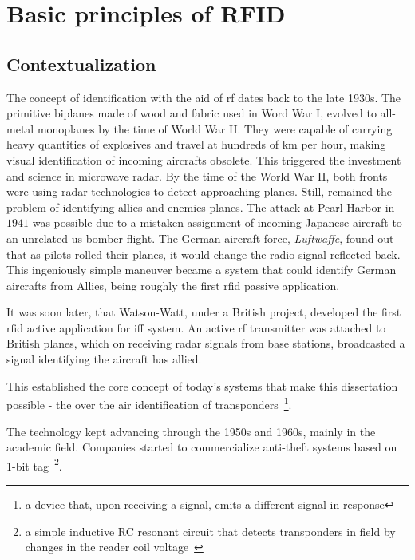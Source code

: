\chapter{Basic principles of RFID}

\section{Contextualization} \label{sec:contextualization}

The concept of identification with the aid of \ac{rf} dates back to the late 1930s. 
The primitive biplanes made of wood and fabric used in Word War I, evolved to all-metal monoplanes by the time of World War II. They were capable of carrying heavy quantities of explosives and travel at hundreds of km per hour, making visual identification of incoming aircrafts obsolete.
This triggered the investment and science in microwave radar.
By the time of the World War II, both fronts were using radar technologies to detect approaching planes. 
Still, remained the problem of identifying allies and enemies planes.
The attack at Pearl Harbor in $1941$ was possible due to a mistaken assignment of incoming Japanese aircraft to an unrelated \ac{us} bomber flight.
The German aircraft force, \emph{Luftwaffe}, found out that as pilots rolled their planes, it would change the radio signal reflected back. This ingeniously simple maneuver became a system that could identify German aircrafts from Allies, being roughly the first \ac{rfid} passive application.~\cite{dobkinRFRFIDSecond2012}

It was soon later, that Watson-Watt, under a British project, developed the first \ac{rfid} active application for \ac{iff} system. An active \ac{rf} transmitter was attached to British planes, which on receiving radar signals from base stations, broadcasted a signal identifying the aircraft has allied.~\cite{HistoryRFIDTechnology}

This established the core concept of today's systems that make this dissertation possible - the over the air identification of transponders~\footnote{a device that, upon receiving a signal, emits a different signal in response}.

The technology kept advancing through the 1950s and 1960s, mainly in the academic field. Companies started to commercialize anti-theft systems based on 1-bit tag~\footnote{a simple inductive RC resonant circuit that detects transponders in field by changes in the reader coil voltage~\cite{andreventuradacruzmarnotozuqueteIdentificacaoPorRFID2018}}.

